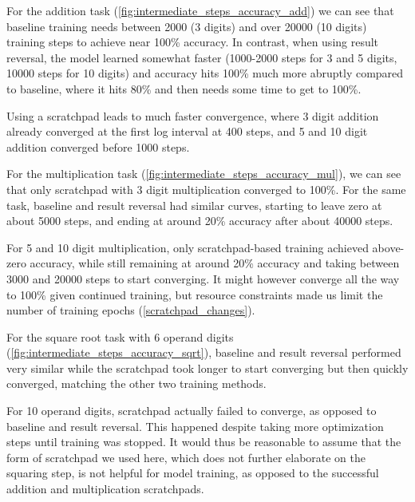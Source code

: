 For the addition task (\cref{fig:intermediate_steps_accuracy_add}) we can see that baseline training needs between 2000 (3 digits) and over 20000 (10 digits) training steps to achieve near 100\% accuracy. In contrast, when using result reversal, the model learned somewhat faster (1000-2000 steps for 3 and 5 digits, 10000 steps for 10 digits) and accuracy hits 100\% much more abruptly compared to baseline, where it hits 80\% and then needs some time to get to 100\%.

Using a scratchpad leads to much faster convergence, where 3 digit addition already converged at the first log interval at 400 steps, and 5 and 10 digit addition converged before 1000 steps.





For the multiplication task (\cref{fig:intermediate_steps_accuracy_mul}), we can see that only scratchpad with 3 digit multiplication converged to 100\%. For the same task, baseline and result reversal had similar curves, starting to leave zero at about 5000 steps, and ending at around 20\% accuracy after about 40000 steps.

For 5 and 10 digit multiplication, only scratchpad-based training achieved above-zero accuracy, while still remaining at around 20\% accuracy and taking between 3000 and 20000 steps to start converging.
It might however converge all the way to 100\% given continued training, but resource constraints made us limit the number of training epochs (\cref{scratchpad_changes}).


For the square root task with 6 operand digits (\cref{fig:intermediate_steps_accuracy_sqrt}), baseline and result reversal performed very similar while the scratchpad took longer to start converging but then quickly converged, matching the other two training methods.

For 10 operand digits, scratchpad actually failed to converge, as opposed to baseline and result reversal. This happened despite taking more optimization steps until training was stopped. It would thus be reasonable to assume that the form of scratchpad we used here, which does not further elaborate on the squaring step, is not helpful for model training, as opposed to the successful addition and multiplication scratchpads.

